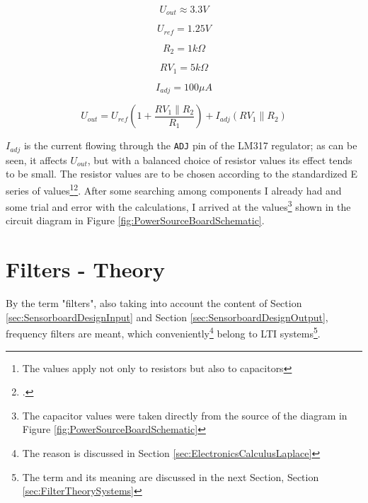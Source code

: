 \documentclass[a4paper, 10pt, final]{article} %
\begin{document}
    \begin{figure}[H]
        \centering
        \begin{minipage}[H]{.15\linewidth}
            \[U_{out} \approx 3.3V\]
        \end{minipage}
        \begin{minipage}[H]{.15\linewidth}
            \[U_{ref}=1.25V\]
        \end{minipage}
        \begin{minipage}[H]{.15\linewidth}
            \[R_2=1k\Omega\]
        \end{minipage}
        \begin{minipage}[H]{.15\linewidth}
            \[RV_1=5k\Omega\]
        \end{minipage}
        \begin{minipage}[H]{.15\linewidth}
            \[I_{adj}=100\mu A\]
        \end{minipage}
        \begin{minipage}[H]{\linewidth}
            \vspace{3ex}
            \[U_{out}=U_{ref}\left(1+\frac{RV_1 \parallel R_2}{R_1}\right)+I_{adj} \left(RV_1 \parallel R_2\right)\]
        \end{minipage}
    \end{figure} 
    \noindent $I_{adj}$ is the current flowing through the \texttt{ADJ} pin of the LM317 regulator; as can be seen, it affects $U_{out}$, but with a balanced choice of resistor values its effect tends to be small.
    The resistor values are to be chosen according to the standardized E series of values\footnote{The values apply not only to resistors but also to capacitors}\:\footcite[]{ESeries:Wiki}.
    After some searching among components I already had and some trial and error with the calculations, I arrived at the values\footnote{The capacitor values were taken directly from the source of the diagram in Figure \ref{fig:PowerSourceBoardSchematic}} shown in the circuit diagram in Figure \ref{fig:PowerSourceBoardSchematic}.
    \clearpage

    \section{Filters - Theory}\label{sec:FilterTheory}
    By the term "filters", also taking into account the content of Section \ref{sec:SensorboardDesignInput} and Section \ref{sec:SensorboardDesignOutput}, frequency filters are meant, which conveniently\footnote{The reason is discussed in Section \ref{sec:ElectronicsCalculusLaplace}} belong to LTI systems\footnote{The term and its meaning are discussed in the next Section, Section \ref{sec:FilterTheorySystems}}.
\end{document}
